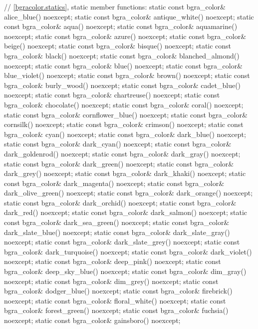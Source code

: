 \begin{codeblock}
{{{{{    // \ref{bgracolor.statics}, static member functions:
    static const bgra_color& alice_blue() noexcept;
    static const bgra_color& antique_white() noexcept;
    static const bgra_color& aqua() noexcept;
    static const bgra_color& aquamarine() noexcept;
    static const bgra_color& azure() noexcept;
    static const bgra_color& beige() noexcept;
    static const bgra_color& bisque() noexcept;
    static const bgra_color& black() noexcept;
    static const bgra_color& blanched_almond() noexcept;
    static const bgra_color& blue() noexcept;
    static const bgra_color& blue_violet() noexcept;
    static const bgra_color& brown() noexcept;
    static const bgra_color& burly_wood() noexcept;
    static const bgra_color& cadet_blue() noexcept;
    static const bgra_color& chartreuse() noexcept;
    static const bgra_color& chocolate() noexcept;
    static const bgra_color& coral() noexcept;
    static const bgra_color& cornflower_blue() noexcept;
    static const bgra_color& cornsilk() noexcept;
    static const bgra_color& crimson() noexcept;
    static const bgra_color& cyan() noexcept;
    static const bgra_color& dark_blue() noexcept;
    static const bgra_color& dark_cyan() noexcept;
    static const bgra_color& dark_goldenrod() noexcept;
    static const bgra_color& dark_gray() noexcept;
    static const bgra_color& dark_green() noexcept;
    static const bgra_color& dark_grey() noexcept;
    static const bgra_color& dark_khaki() noexcept;
    static const bgra_color& dark_magenta() noexcept;
    static const bgra_color& dark_olive_green() noexcept;
    static const bgra_color& dark_orange() noexcept;
    static const bgra_color& dark_orchid() noexcept;
    static const bgra_color& dark_red() noexcept;
    static const bgra_color& dark_salmon() noexcept;
    static const bgra_color& dark_sea_green() noexcept;
    static const bgra_color& dark_slate_blue() noexcept;
    static const bgra_color& dark_slate_gray() noexcept;
    static const bgra_color& dark_slate_grey() noexcept;
    static const bgra_color& dark_turquoise() noexcept;
    static const bgra_color& dark_violet() noexcept;
    static const bgra_color& deep_pink() noexcept;
    static const bgra_color& deep_sky_blue() noexcept;
    static const bgra_color& dim_gray() noexcept;
    static const bgra_color& dim_grey() noexcept;
    static const bgra_color& dodger_blue() noexcept;
    static const bgra_color& firebrick() noexcept;
    static const bgra_color& floral_white() noexcept;
    static const bgra_color& forest_green() noexcept;
    static const bgra_color& fuchsia() noexcept;
    static const bgra_color& gainsboro() noexcept;
}}}}}
\end{codeblock}
